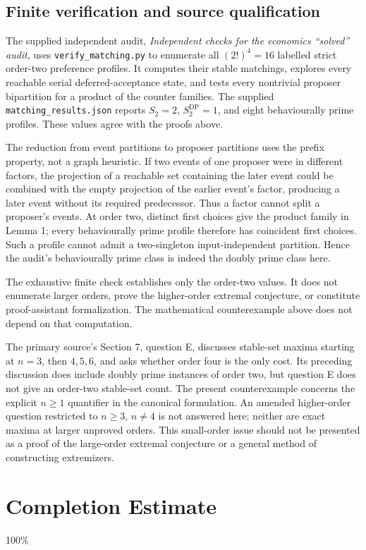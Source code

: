 \documentclass[11pt,a4paper]{article}
\begin{document}
\subsection*{Finite verification and source qualification}
The supplied independent audit, \emph{Independent checks for the economics ``solved'' audit}, uses \texttt{verify\_matching.py} to enumerate all $(2!)^4=16$ labelled strict order-two preference profiles. It computes their stable matchings, explores every reachable serial deferred-acceptance state, and tests every nontrivial proposer bipartition for a product of the counter families. The supplied \texttt{matching\_results.json} reports $S_2=2$, $S_2^{\mathrm{DP}}=1$, and eight behaviourally prime profiles. These values agree with the proofs above.

The reduction from event partitions to proposer partitions uses the prefix property, not a graph heuristic. If two events of one proposer were in different factors, the projection of a reachable set containing the later event could be combined with the empty projection of the earlier event's factor, producing a later event without its required predecessor. Thus a factor cannot split a proposer's events. At order two, distinct first choices give the product family in Lemma 1; every behaviourally prime profile therefore has coincident first choices. Such a profile cannot admit a two-singleton input-independent partition. Hence the audit's behaviourally prime class is indeed the doubly prime class here.

The exhaustive finite check establishes only the order-two values. It does not enumerate larger orders, prove the higher-order extremal conjecture, or constitute proof-assistant formalization. The mathematical counterexample above does not depend on that computation.

The primary source's Section 7, question E, discusses stable-set maxima starting at $n=3$, then $4,5,6$, and asks whether order four is the only cost. Its preceding discussion does include doubly prime instances of order two, but question E does not give an order-two stable-set count. The present counterexample concerns the explicit $n\geq1$ quantifier in the canonical formulation. An amended higher-order question restricted to $n\geq3$, $n\ne4$ is not answered here; neither are exact maxima at larger unproved orders. This small-order issue should not be presented as a proof of the large-order extremal conjecture or a general method of constructing extremizers.

\section{Completion Estimate}
100\%
\end{document}
